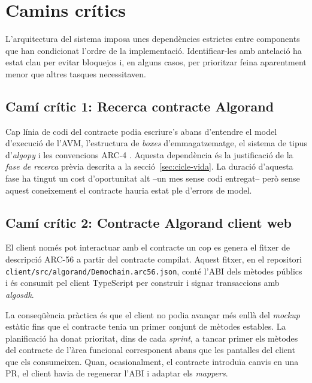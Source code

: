 \section{Camins crítics}
\label{sec:camins-critics}

L'arquitectura del sistema imposa unes dependències estrictes entre
components que han condicionat l'ordre de la implementació. Identificar-les
amb antelació ha estat clau per evitar bloquejos i, en alguns casos, per
prioritzar feina aparentment menor que altres tasques necessitaven.

\subsection{Camí crític 1: Recerca \textrightarrow{} contracte Algorand}

Cap línia de codi del contracte podia escriure's abans d'entendre el model
d'execució de l'\ac{AVM}, l'estructura de \emph{boxes} d'emmagatzematge, el
sistema de tipus d'\emph{algopy} i les convencions ARC-4
\cite{algorandfoundation2023arc4}. Aquesta dependència és la justificació de
la \emph{fase de recerca} prèvia descrita a la
secció~\ref{sec:cicle-vida}. La duració d'aquesta fase ha tingut un cost
d'oportunitat alt --un mes sense codi entregat-- però sense aquest
coneixement el contracte hauria estat ple d'errors de model.

\subsection{Camí crític 2: Contracte Algorand \textrightarrow{} client web}

El client només pot interactuar amb el contracte un cop es genera el fitxer
de descripció ARC-56 \cite{algorandfoundation2023arc56} a partir del
contracte compilat. Aquest fitxer, en el repositori
\texttt{client/src/algorand/Demochain.arc56.json}, conté l'\ac{ABI} dels
mètodes públics i és consumit pel client TypeScript per construir i signar
transaccions amb \emph{algosdk}.

La conseqüència pràctica és que el client no podia avançar més enllà del
\emph{mockup} estàtic fins que el contracte tenia un primer conjunt de
mètodes estables. La planificació ha donat prioritat, dins de cada
\emph{sprint}, a tancar primer els mètodes del contracte de l'àrea
funcional corresponent abans que les pantalles del client que els
consumeixen. Quan, ocasionalment, el contracte introduïa canvis en una
\ac{PR}, el client havia de regenerar l'\ac{ABI} i adaptar els
\emph{mappers}.

